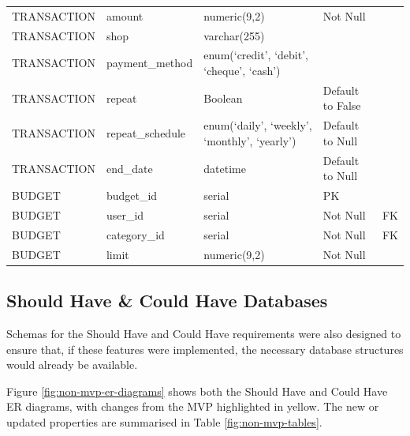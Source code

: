 \documentclass{l4proj}
\begin{document}
\begin{table}[htb]
\begin{adjustbox}{max width=\textwidth,center}
\begin{tabular}{|l|l|l|l|l|}
        TRANSACTION & amount & numeric(9,2) & Not Null & \\
        TRANSACTION & shop & varchar(255) & & \\
        TRANSACTION & payment\_method & enum(‘credit’, ‘debit’, ‘cheque’, ‘cash’) & & \\
        TRANSACTION & repeat & Boolean & Default to False & \\
        TRANSACTION & repeat\_schedule & enum(‘daily’, ‘weekly’, ‘monthly’, ‘yearly’) & Default to Null & \\
        TRANSACTION & end\_date & datetime & Default to Null & \\
        BUDGET & budget\_id & serial & PK & \\
        BUDGET & user\_id & serial & Not Null & FK \\
        BUDGET & category\_id & serial & Not Null & FK \\
        BUDGET & limit & numeric(9,2) & Not Null & \\
        \hline
    \end{tabular}
    \end{adjustbox}
\end{table}
\normalsize
\newpage


\subsection{Should Have \& Could Have Databases}
Schemas for the Should Have and Could Have requirements were also designed to ensure that, if these features were implemented, the necessary database structures would already be available.

Figure \ref{fig:non-mvp-er-diagrams} shows both the Should Have and Could Have ER diagrams, with changes from the MVP highlighted in yellow. The new or updated properties are summarised in Table \ref{fig:non-mvp-tables}.
\end{document}
